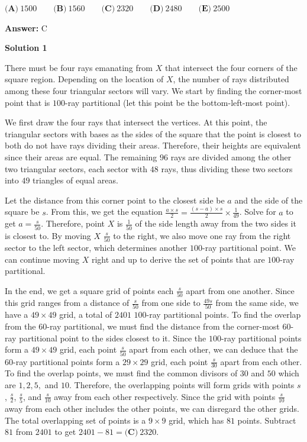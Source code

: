 \begin{enumerate}
 $\textbf{(A)}\ 1500 \qquad \textbf{(B)}\ 1560 \qquad \textbf{(C)}\ 2320 \qquad \textbf{(D)}\ 2480 \qquad \textbf{(E)}\ 2500$

 \textbf{Answer: }C



\textbf{Solution 1}

There must be four rays emanating from $X$ that intersect the four corners of the square region. Depending on the location of $X$, the number of rays distributed among these four triangular sectors will vary. We start by finding the corner-most point that is $100$-ray partitional (let this point be the bottom-left-most point). 

 We first draw the four rays that intersect the vertices. At this point, the triangular sectors with bases as the sides of the square that the point is closest to both do not have rays dividing their areas. Therefore, their heights are equivalent since their areas are equal. The remaining $96$ rays are divided among the other two triangular sectors, each sector with $48$ rays, thus dividing these two sectors into $49$ triangles of equal areas. 

 Let the distance from this corner point to the closest side be $a$ and the side of the square be $s$. From this, we get the equation $\frac{a\times s}{2}=\frac{(s-a)\times s}{2}\times\frac1{49}$. Solve for $a$ to get $a=\frac s{50}$. Therefore, point $X$ is $\frac1{50}$ of the side length away from the two sides it is closest to. By moving $X$ $\frac s{50}$ to the right, we also move one ray from the right sector to the left sector, which determines another $100$-ray partitional point. We can continue moving $X$ right and up to derive the set of points that are $100$-ray partitional. 

 In the end, we get a square grid of points each $\frac s{50}$ apart from one another. Since this grid ranges from a distance of $\frac s{50}$ from one side to $\frac{49s}{50}$ from the same side, we have a $49\times49$ grid, a total of $2401$ $100$-ray partitional points. To find the overlap from the $60$-ray partitional, we must find the distance from the corner-most $60$-ray partitional point to the sides closest to it. Since the $100$-ray partitional points form a $49\times49$ grid, each point $\frac s{50}$ apart from each other, we can deduce that the $60$-ray partitional points form a $29\times29$ grid, each point $\frac s{30}$ apart from each other. To find the overlap points, we must find the common divisors of $30$ and $50$ which are $1, 2, 5,$ and $10$. Therefore, the overlapping points will form grids with points $s$, $\frac s{2}$, $\frac s{5}$, and $\frac s{10}$ away from each other respectively. Since the grid with points $\frac s{10}$ away from each other includes the other points, we can disregard the other grids. The total overlapping set of points is a $9\times9$ grid, which has $81$ points. Subtract $81$ from $2401$ to get $2401-81=\boxed{\textbf{(C)}\ 2320}$.


\end{enumerate}
